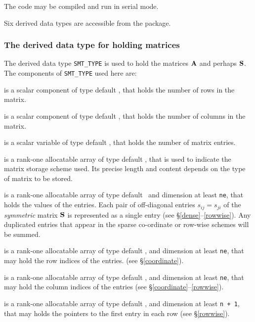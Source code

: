 \documentclass{galahad}
\begin{document}
\noindent
The code may be compiled and run in serial mode.


\galtypes
Six derived data types are accessible from the package.


\subsubsection{The derived data type for holding matrices}\label{typesmt}
The derived data type {\tt SMT\_TYPE} is used to hold the matrices ${\mathbf{A}}$
and perhaps ${\mathbf{S}}$.
The components of {\tt SMT\_TYPE} used here are:

\begin{description}

 is a scalar component of type default \integer, 
that holds the number of rows in the matrix. 
 
 is a scalar component of type default \integer, 
that holds the number of columns in the matrix. 
 
 is a scalar variable of type default \integer, that
holds the number of matrix entries.

 is a rank-one allocatable array of type default \character, that
is used to indicate the matrix storage scheme used. Its precise length and
content depends on the type of matrix to be stored.

 is a rank-one allocatable array of type default \realdp\, 
and dimension at least {\tt ne}, that holds the values of the entries. 
Each pair of off-diagonal entries $s_{ij} = s_{ji}$ of the {\em symmetric}
matrix ${\mathbf{S}}$ is represented as a single entry 
(see \S\ref{dense}--\ref{rowwise}).
Any duplicated entries that appear in the sparse 
co-ordinate or row-wise schemes will be summed. 

 is a rank-one allocatable array of type default \integer, 
and dimension at least {\tt ne}, that may hold the row indices of the entries. 
(see \S\ref{coordinate}).

 is a rank-one allocatable array of type default \integer, 
and dimension at least {\tt ne}, that may hold the column indices of the entries
(see \S\ref{coordinate}--\ref{rowwise}).

 is a rank-one allocatable array of type default \integer, 
and dimension at least {\tt n + 1}, that may holds the pointers to
the first entry in each row (see \S\ref{rowwise}).

\end{description}
\end{document}
